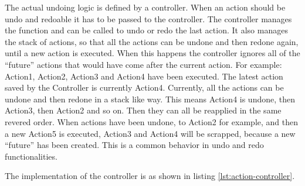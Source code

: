 The actual undoing logic is defined by a controller. When an action should be undo and redoable it has to be passed to the controller. The controller manages the function and can be called to undo or redo the last action. It also manages the stack of actions, so that all the actions can be undone and then redone again, until a new action is executed. When this happens the controller ignores all of the ``future'' actions that would have come after the current action. For example: Action1, Action2, Action3 and Action4 have been executed. The latest action saved by the Controller is currently Action4. Currently, all the actions can be undone and then redone in a stack like way. This means Action4 is undone, then Action3, then Action2 and so on. Then they can all be reapplied in the same revered order. When actions have been undone, to Action2 for example, and then a new Action5 is executed, Action3 and Action4 will be scrapped, because a new ``future'' has been created. This is a common behavior in undo and redo functionalities.

The implementation of the controller is as shown in listing \ref{lst:action-controller}.

